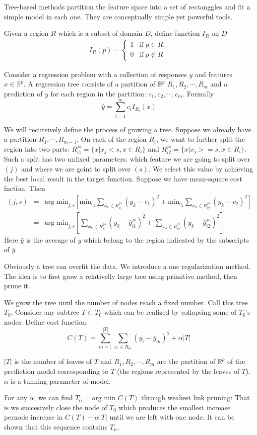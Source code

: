 \documentclass{article}
\author{Yinan Zhu}
\begin{document}
Tree-based methods partition the feature space into a set of rectanggles and fit a simple model in each one. They are conceptually simple yet powerful tools.

Given a region $R$ which is a subset of domain $D$, define function $I_R$ on $D$ 
\begin{eqnarray}
I_R(p)= \left\{
\begin{array}{rl}
1 & \textrm{if } p \in R,\\
0 & \textrm{if } p \notin R
\end{array} \right.\nonumber
\end{eqnarray}

Consider a regression problem with a collection of responses $y$ and features $x\in \mathbb{R}^p$. A regression tree consists of a partition of $\mathbb{R}^p$ $R_1, R_2,\cdots,R_m$ and a prediction of $y$ for each region in the partition: $c_1,c_2,\cdots,c_m$. Formally
\[
\hat{y}=\sum_{i=1}^m c_iI_{R_i}(x)
\]

We will recursively define the process of growing a tree. Suppose we already have a partition $R_1,\cdots, R_{m-1}$. On each of the region $R_i$, we want to further split the region into two parts: $R_{i1}^{js}=\{x|x_j<s,x\in R_i\}$ and $R_{i2}^{js}=\{x|x_j>=s,x\in R_i\}$. Such a split has two unfixed parameters: which feature we are going to split over $(j)$ and where we are goint to split over $(s)$. We select this value by achieving the best local result in the target function. Suppose we have mean-square cost fnction. Then
\begin{eqnarray}
(j,s)&=&\textrm{arg min}_{j,s}[\textrm{min}_{c_1}\sum_{x_k\in R_{i1}^{js}}(y_k-c_1)^2+\textrm{min}_{c_2}\sum_{x_k\in R_{i2}^{js}}(y_k-c_2)^2]\nonumber\\
&=&\textrm{arg min}_{j,s}[\sum_{x_k\in R_{i1}^{js}}(y_k-\bar{y}_{i1}^{js})^2+\sum_{x_k\in R_{i2}^{js}}(y_k-\bar{y}_{i2}^{js})^2]\nonumber
\end{eqnarray}
Here $\bar{y}$ is the average of $y$ which belong to the region indicated by the subscripts of $\bar{y}$

Obviously a tree can overfit the data. We introduce a one regularization method. The idea is to first grow a relativelly large tree using primitive method, then prune it. 

We grow the tree until the number of nodes reach a fixed number. Call this tree $T_0$. Consider any subtree $T \subset T_0$ which can be realized by collapsing some of $T_0$'s nodes. Define cost function
\[
C(T)=\sum_{m=1}^{|T|}\sum_{x_i\in R_m}(y_i-\bar{y}_m)^2+\alpha|T|
\]

$|T|$ is the number of leaves of $T$ and $R_1, R_2,\cdots, R_m$ are the partition of $\mathbb{R}^p$ of the prediction model corresponding to $T$ (the regions represented by the leaves of $T$). $\alpha$ is a tunning parameter of model. 

For any $\alpha$, we can find $T_\alpha=\textrm{arg min }C(T)$ through weakest link pruning: That is we succesively close the node of $T_0$ which produces the smallest increase pernode increase in $C(T)-\alpha|T|$ until we are left with one node. It can be shown that this sequence contains $T_\alpha$.
\end{document}

